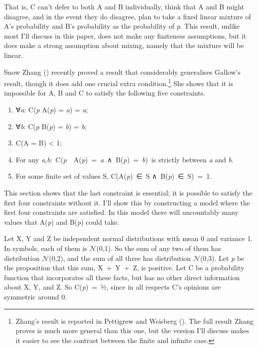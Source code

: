 \documentclass[
  12pt,
  letterpaper,
  DIV=11,
  numbers=noendperiod]{scrartcl}
\providecommand{\tightlist}{%
  \setlength{\itemsep}{0pt}\setlength{\parskip}{0pt}}\usepackage{longtable,booktabs,array}
\begin{document}
That is, C can't defer to both A and B individually, think that A and B
might disagree, and in the event they do disagree, plan to take a fixed
linear mixture of A's probability and B's probability as the probability
of \emph{p}. This result, unlike most I'll discuss in this paper, does
not make any finiteness assumptions, but it does make a strong
assumption about mixing, namely that the mixture will be linear.

Snow Zhang () recently proved a
result that considerably generalises Gallow's result, though it does add
one crucial extra condition.\footnote{Zhang's result is reported in
  Pettigrew and Weisberg ().
  The full result Zhang proves is much more general than this one, but
  the version I'll discuss makes it easier to see the contrast between
  the finite and infinite case.} She shows that it is impossible for A,
B and C to satisfy the following five constraints.

\begin{enumerate}
\def\labelenumi{\arabic{enumi}.}
\tightlist
\item
  ∀\emph{a}: C(\emph{p} \textbar{} A(\emph{p}) = \emph{a}) = \emph{a};
\item
  ∀\emph{b}: C(\emph{p} \textbar{} B(\emph{p}) = \emph{b}) = \emph{b};
\item
  C(A = B) \textless{} 1;
\item
  For any
  \emph{a},\emph{b}:~C(\emph{p}~\textbar~A(\emph{p})~=~\emph{a}~∧~B(\emph{p})~=~\emph{b})~is
  strictly between \emph{a} and \emph{b}.
\item
  For some finite set of values S, C(A(\emph{p})~∈~S
  ∧~B(\emph{p})~∈~S)~=~1.
\end{enumerate}

This section shows that the last constraint is essential; it is possible
to satisfy the first four constraints without it. I'll show this by
constructing a model where the first four constraints are satisfied. In
this model there will uncountably many values that A(\emph{p}) and
B(\emph{p}) could take.

Let X, Y and Z be independent normal distributions with mean 0 and
variance 1. In symbols, each of them is \(\mathcal{N}\)(0,1). So the sum
of any two of them has distribution \(\mathcal{N}\)(0,2), and the sum of
all three has distribution \(\mathcal{N}\)(0,3). Let \emph{p} be the
proposition that this sum, X~+~Y~+~Z, is positive. Let C be a
probability function that incorporates all these facts, but has no other
direct information about X, Y, and Z. So C(\emph{p})~=~½, since in all
respects C's opinions are symmetric around 0.
\end{document}

